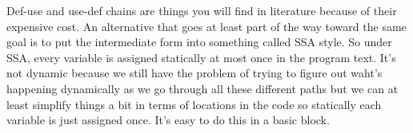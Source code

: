 Def-use and use-def chains are things you will find in literature because of their expensive cost. An alternative that goes at least part of the way toward the same goal is to put the intermediate form into something called SSA style. 
So under SSA, every variable is assigned statically at most once in the program text. It's not dynamic because we still have the problem of trying to figure out waht's happening dynamically as we go through all these different paths but we can at least simplify things a bit in terms of locations in the code 
so statically each variable is just assigned once. It's easy to do this in a basic block.























